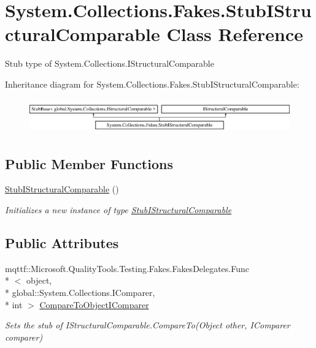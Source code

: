 \hypertarget{class_system_1_1_collections_1_1_fakes_1_1_stub_i_structural_comparable}{\section{System.\-Collections.\-Fakes.\-Stub\-I\-Structural\-Comparable Class Reference}
\label{class_system_1_1_collections_1_1_fakes_1_1_stub_i_structural_comparable}
}


Stub type of System.\-Collections.\-I\-Structural\-Comparable 


Inheritance diagram for System.\-Collections.\-Fakes.\-Stub\-I\-Structural\-Comparable\-:\begin{figure}[H]
\begin{center}
\leavevmode
\includegraphics[height=1.509434cm]{class_system_1_1_collections_1_1_fakes_1_1_stub_i_structural_comparable}
\end{center}
\end{figure}
\subsection*{Public Member Functions}
\begin{DoxyCompactItemize}
\item 
\hyperlink{class_system_1_1_collections_1_1_fakes_1_1_stub_i_structural_comparable_a2517dfcb6423ed9ef3ca9fb4b19a151a}{Stub\-I\-Structural\-Comparable} ()
\begin{DoxyCompactList}\small\item\em Initializes a new instance of type \hyperlink{class_system_1_1_collections_1_1_fakes_1_1_stub_i_structural_comparable}{Stub\-I\-Structural\-Comparable}\end{DoxyCompactList}\end{DoxyCompactItemize}
\subsection*{Public Attributes}
\begin{DoxyCompactItemize}
\item 
mqttf\-::\-Microsoft.\-Quality\-Tools.\-Testing.\-Fakes.\-Fakes\-Delegates.\-Func\\*
$<$ object, \\*
global\-::\-System.\-Collections.\-I\-Comparer, \\*
int $>$ \hyperlink{class_system_1_1_collections_1_1_fakes_1_1_stub_i_structural_comparable_a88251285e148d127c35952e3c374c20b}{Compare\-To\-Object\-I\-Comparer}
\begin{DoxyCompactList}\small\item\em Sets the stub of I\-Structural\-Comparable.\-Compare\-To(\-Object other, I\-Comparer comparer)\end{DoxyCompactList}\end{DoxyCompactItemize}


